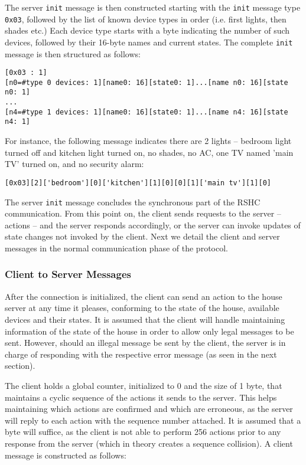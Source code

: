 \noindent
The server {\tt init} message is then constructed starting with the {\tt init} message type {\tt 0x03}, followed by the list of known device types in order (i.e. first lights, then shades etc.) Each device type starts with a byte indicating the number of such devices, followed by their 16-byte names and current states. The complete {\tt init} message is then structured as follows:

\begin{verbatim}
[0x03 : 1]
[n0=#type 0 devices: 1][name0: 16][state0: 1]...[name n0: 16][state n0: 1]
...
[n4=#type 1 devices: 1][name0: 16][state0: 1]...[name n4: 16][state n4: 1]
\end{verbatim}

\noindent
For instance, the following message indicates there are 2 lights -- bedroom light turned off and kitchen light turned on, no shades, no AC, one TV named 'main TV' turned on, and no security alarm:

\begin{verbatim}
[0x03][2]['bedroom'][0]['kitchen'][1][0][0][1]['main tv'][1][0]
\end{verbatim}

\noindent
The server {\tt init} message concludes the synchronous part of the RSHC communication. From this point on, the client sends requests to the server -- actions -- and the server responds accordingly, or the server can invoke updates of state changes not invoked by the client. Next we detail the client and server messages in the normal communication phase of the protocol.


\subsubsection{Client to Server Messages}
\label{sec:pdus:pdu:c_to_s}

After the connection is initialized, the client can send an action to the house server at any time it pleases, conforming to the state of the house, available devices and their states. It is assumed that the client will handle maintaining information of the state of the house in order to allow only legal messages to be sent. However, should an illegal message be sent by the client, the server is in charge of responding with the respective error message (as seen in the next section).

The client holds a global counter, initialized to 0 and the size of 1 byte, that maintains a cyclic sequence of the actions it sends to the server. This helps maintaining which actions are confirmed and which are erroneous, as the server will reply to each action with the sequence number attached. It is assumed that a byte will suffice, as the client is not able to perform 256 actions prior to any response from the server (which in theory creates a sequence collision). A client message is constructed as follows:

